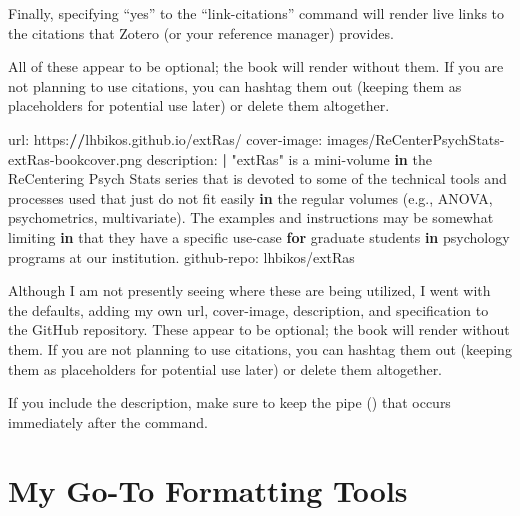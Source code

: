 \documentclass[
]{book}
\newenvironment{Shaded}{\begin{snugshade}}{\end{snugshade}}
\newcommand{\ControlFlowTok}[1]{\textcolor[rgb]{0.13,0.29,0.53}{\textbf{#1}}}
\newcommand{\ErrorTok}[1]{\textcolor[rgb]{0.64,0.00,0.00}{\textbf{#1}}}
\newcommand{\FunctionTok}[1]{\textcolor[rgb]{0.00,0.00,0.00}{#1}}
\newcommand{\NormalTok}[1]{#1}
\newcommand{\SpecialCharTok}[1]{\textcolor[rgb]{0.00,0.00,0.00}{#1}}
\newcommand{\StringTok}[1]{\textcolor[rgb]{0.31,0.60,0.02}{#1}}
\begin{document}
Finally, specifying ``yes'' to the ``link-citations'' command will render live links to the citations that Zotero (or your reference manager) provides.

All of these appear to be optional; the book will render without them. If you are not planning to use citations, you can hashtag them out (keeping them as placeholders for potential use later) or delete them altogether.

\begin{Shaded}
\begin{Highlighting}[]
\NormalTok{url}\SpecialCharTok{:}\NormalTok{ https}\SpecialCharTok{:}\ErrorTok{//}\NormalTok{lhbikos.github.io}\SpecialCharTok{/}\NormalTok{extRas}\SpecialCharTok{/} 
\NormalTok{cover}\SpecialCharTok{{-}}\NormalTok{image}\SpecialCharTok{:}\NormalTok{ images}\SpecialCharTok{/}\NormalTok{ReCenterPsychStats}\SpecialCharTok{{-}}\NormalTok{extRas}\SpecialCharTok{{-}}\NormalTok{bookcover.png }
\NormalTok{description}\SpecialCharTok{:} \ErrorTok{|}
  \StringTok{"extRas"}\NormalTok{ is a mini}\SpecialCharTok{{-}}\NormalTok{volume }\ControlFlowTok{in}\NormalTok{ the ReCentering Psych Stats series that is devoted to some of the technical tools and processes used that just do not fit easily }\ControlFlowTok{in}\NormalTok{ the regular }\FunctionTok{volumes}\NormalTok{ (e.g., ANOVA, psychometrics, multivariate). The examples and instructions may be somewhat limiting }\ControlFlowTok{in}\NormalTok{ that they have a specific use}\SpecialCharTok{{-}}\NormalTok{case }\ControlFlowTok{for}\NormalTok{ graduate students }\ControlFlowTok{in}\NormalTok{ psychology programs at our institution.}
\NormalTok{github}\SpecialCharTok{{-}}\NormalTok{repo}\SpecialCharTok{:}\NormalTok{ lhbikos}\SpecialCharTok{/}\NormalTok{extRas}
\end{Highlighting}
\end{Shaded}

Although I am not presently seeing where these are being utilized, I went with the defaults, adding my own url, cover-image, description, and specification to the GitHub repository. These appear to be optional; the book will render without them. If you are not planning to use citations, you can hashtag them out (keeping them as placeholders for potential use later) or delete them altogether.

If you include the description, make sure to keep the pipe (\textbar) that occurs immediately after the command.

\hypertarget{my-go-to-formatting-tools}{%
\section{My Go-To Formatting Tools}\label{my-go-to-formatting-tools}}
\end{document}
